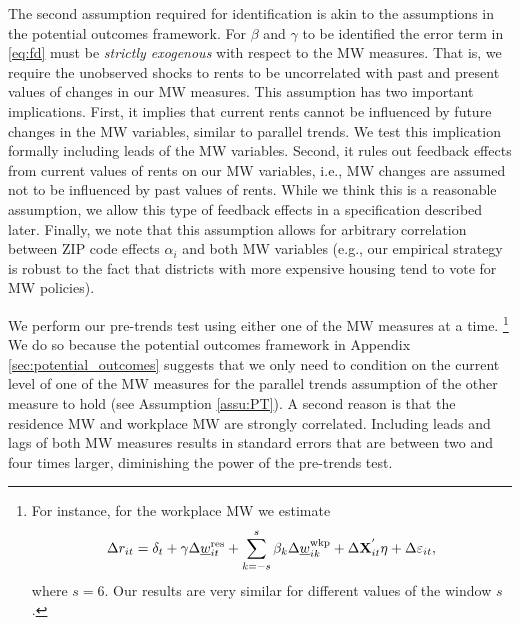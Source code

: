 The second assumption required for identification is akin to the assumptions 
in the potential outcomes framework.
For $\beta$ and $\gamma$ to be identified the error term in \eqref{eq:fd} must 
be \textit{strictly exogenous} with respect to the MW measures. 
That is, we require the unobserved shocks to rents to be uncorrelated with 
past and present values of changes in our MW measures.
This assumption has two important implications.
First,
it implies that current rents cannot be influenced by future changes in the MW 
variables, similar to parallel trends.
We test this implication formally including leads of the MW variables.
Second,
it rules out feedback effects from current values of rents on our MW variables, 
i.e., MW changes are assumed not to be influenced by past values of rents.
While we think this is a reasonable assumption, we allow this type of feedback 
effects in a specification described later.
Finally, we note that this assumption allows for arbitrary correlation between 
ZIP code effects $\alpha_i$ and both MW variables 
(e.g., our empirical strategy is robust to the fact that districts with more
expensive housing tend to vote for MW policies).

We perform our pre-trends test using either one of the MW measures at a time.%
\footnote{For instance, for the workplace MW we estimate
\begin{equation*}
    \Delta r_{it} = \delta_t
                  + \gamma \Delta \underline{w}^{\text{res}}_{it} 
                  + \sum_{k=-s}^{s} \beta_k \Delta \underline{w}^{\text{wkp}}_{ik}
                  + \Delta \mathbf{X}^{'}_{it}\eta
                  + \Delta \varepsilon_{it} ,
\end{equation*}
where $s=6$.
Our results are very similar for different values of the window $s$.}
We do so because the potential outcomes framework in Appendix 
\ref{sec:potential_outcomes} suggests that we only need to condition on the
current level of one of the MW measures for the parallel trends assumption
of the other measure to hold (see Assumption \ref{assu:PT}).
A second reason is that the residence MW and workplace MW are strongly 
correlated.
Including leads and lags of both MW measures results in standard errors
that are between two and four times larger, diminishing the power of the 
pre-trends test.

